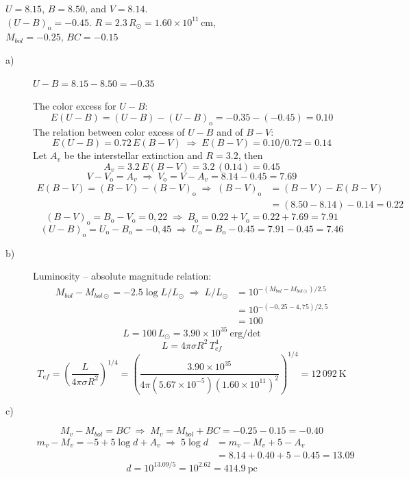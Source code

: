 $U = 8.15$, $B = 8.50$, and $V = 8.14$.\\
$(U-B)_{\mathrm{o}} = -0.45$. \quad
$R = 2.3\,R_\odot = 1.60 \times 10^{11}$\,cm,\\
$M_{bol} = -0.25$, $BC = -0.15$

\begin{description}
\item[a)] $U - B = 8.15 - 8.50 = -0.35$

The color excess for $U-B$:
\[
E(U-B) = (U-B) - (U-B)_{\mathrm{o}} = -0.35 - (-0.45) = 0.10
\]
The relation between color excess of $U-B$ and of $B-V$:
\[
E(U-B) = 0.72\,E(B-V)
\;\Longrightarrow\;
E(B-V) = 0.10/0.72 = 0.14 \tag*{(15\%)}
\]
Let $A_v$ be the interstellar extinction and $R = 3.2$, then
\[
A_v = 3.2\,E(B-V) = 3.2\,(0.14) = 0.45
\]
\[
V - V_{\mathrm{o}} = A_v
\;\Longrightarrow\;
V_{\mathrm{o}} = V - A_v = 8.14 - 0.45 = 7.69
\]
\begin{align*}
E(B-V) = (B-V) - (B-V)_{\mathrm{o}}
\;\Longrightarrow\;
(B-V)_{\mathrm{o}} &= (B-V) - E(B-V)\\
&= (8.50 - 8.14) - 0.14 = 0.22 \tag*{(15\%)}
\end{align*}
\[
(B-V)_{\mathrm{o}} = B_{\mathrm{o}} - V_{\mathrm{o}} = 0{,}22
\;\Longrightarrow\;
B_{\mathrm{o}} = 0.22 + V_{\mathrm{o}} = 0.22 + 7.69 = 7.91 \tag*{(10\%)}
\]
\[
(U-B)_{\mathrm{o}} = U_{\mathrm{o}} - B_{\mathrm{o}} = -0{,}45
\;\Longrightarrow\;
U_{\mathrm{o}} = B_{\mathrm{o}} - 0.45 = 7.91 - 0.45 = 7.46 \tag*{(10\%)}
\]

\item[b)] Luminosity -- absolute magnitude relation:
\begin{align*}
M_{bol} - M_{bol\odot} = -2.5 \log L/L_\odot
\;\Longrightarrow\;
L/L_\odot &= 10^{-(M_{bol} - M_{bol\odot})/2.5}\\
&= 10^{-(-0{,}25 - 4{,}75)/2{,}5}\\
&= 100 \tag*{(10\%)}
\end{align*}
\[
L = 100\,L_\odot = 3.90 \times 10^{35}~\mathrm{erg/det}
\]
\[
L = 4\pi\sigma R^2\,T_{ef}^4
\]
\[
T_{ef} = \left( \frac{L}{4\pi\sigma R^2} \right)^{\!1/4}
  = \left( \frac{3.90 \times 10^{35}}
                {4\pi (5.67 \times 10^{-5})(1.60 \times 10^{11})^2}
    \right)^{\!1/4}
  = 12\,092~\mathrm{K} \tag*{(15\%)}
\]

\item[c)]
\[
M_v - M_{bol} = BC
\;\Longrightarrow\;
M_v = M_{bol} + BC = -0.25 - 0.15 = -0.40 \tag*{(10\%)}
\]
\begin{align*}
m_v - M_v = -5 + 5 \log d + A_v
\;\Longrightarrow\;
5 \log d &= m_v - M_v + 5 - A_v\\
&= 8.14 + 0.40 + 5 - 0.45 = 13.09
\end{align*}
\[
d = 10^{13.09/5} = 10^{2.62} = 414.9~\mathrm{pc} \tag*{(15\%)}
\]
\end{description}
